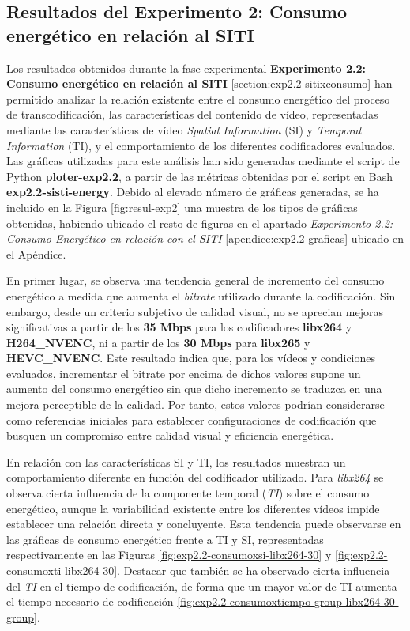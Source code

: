 \subsection{Resultados del Experimento 2: Consumo energético en relación al SITI}\label{subsec:exp2.2-siti}
 Los resultados obtenidos durante la fase experimental \textbf{Experimento 2.2: Consumo energético en relación al SITI} \ref{section:exp2.2-sitixconsumo} han permitido analizar la relación existente entre el consumo energético del proceso de transcodificación, las características del contenido de vídeo, representadas mediante las características de vídeo \textit{Spatial Information} (SI) y \textit{Temporal Information} (TI), y el comportamiento de los diferentes codificadores evaluados. Las gráficas utilizadas para este análisis han sido generadas mediante el script de Python \textbf{ploter-exp2.2}, a partir de las métricas obtenidas por el script en Bash \textbf{exp2.2-sisti-energy}. Debido al elevado número de gráficas generadas, se ha incluido en la Figura \ref{fig:resul-exp2} una muestra de los tipos de gráficas obtenidas, habiendo ubicado el resto de figuras en el apartado \textit{Experimento 2.2: Consumo Energético en relación con el SITI} \ref{apendice:exp2.2-graficas} ubicado en el Apéndice.

 En primer lugar, se observa una tendencia general de incremento del consumo energético a medida que aumenta el \textit{bitrate} utilizado durante la codificación. Sin embargo, desde un criterio subjetivo de calidad visual, no se aprecian mejoras significativas a partir de los \textbf{35 Mbps} para los codificadores \textbf{libx264} y \textbf{H264\_NVENC}, ni a partir de los \textbf{30 Mbps} para \textbf{libx265} y \textbf{HEVC\_NVENC}. Este resultado indica que, para los vídeos y condiciones evaluados, incrementar el bitrate por encima de dichos valores supone un aumento del consumo energético sin que dicho incremento se traduzca en una mejora perceptible de la calidad. Por tanto, estos valores podrían considerarse como referencias iniciales para establecer configuraciones de codificación que busquen un compromiso entre calidad visual y eficiencia energética.
 
 En relación con las características SI y TI, los resultados muestran un comportamiento diferente en función del codificador utilizado. Para \textit{libx264} se observa cierta influencia de la componente temporal (\textit{TI}) sobre el consumo energético, aunque la variabilidad existente entre los diferentes vídeos impide establecer una relación directa y concluyente. Esta tendencia puede observarse en las gráficas de consumo energético frente a TI y SI, representadas respectivamente en las Figuras \ref{fig:exp2.2-consumoxsi-libx264-30} y \ref{fig:exp2.2-consumoxti-libx264-30}. Destacar que también se ha observado cierta influencia del \textit{TI} en el tiempo de codificación, de forma que un mayor valor de TI aumenta el tiempo necesario de codificación \ref{fig:exp2.2-consumoxtiempo-group-libx264-30-group}.
 
